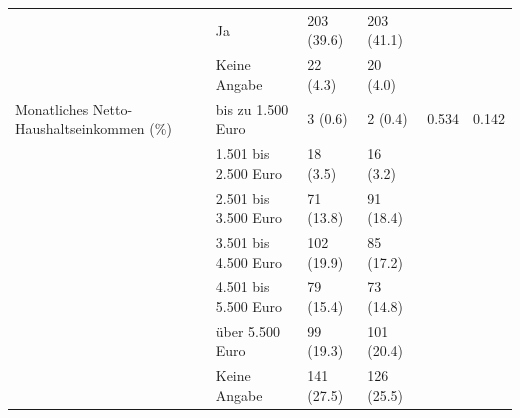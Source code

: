 \begin{table}[!h]
{\begin{tabular}[t]{llllll}
 & Ja & 203 (39.6) & 203 (41.1) &  & \\
 & Keine Angabe & 22 (4.3) & 20 (4.0) &  & \\
Monatliches Netto-Haushaltseinkommen (\%) & bis zu 1.500 Euro & 3 (0.6) & 2 (0.4) & 0.534 & 0.142\\
 & 1.501 bis 2.500 Euro & 18 (3.5) & 16 (3.2) &  & \\
 & 2.501 bis 3.500 Euro & 71 (13.8) & 91 (18.4) &  & \\
 & 3.501 bis 4.500 Euro & 102 (19.9) & 85 (17.2) &  & \\
 & 4.501 bis 5.500 Euro & 79 (15.4) & 73 (14.8) &  & \\
 & über 5.500 Euro & 99 (19.3) & 101 (20.4) &  & \\
 & Keine Angabe & 141 (27.5) & 126 (25.5) &  & \\
\bottomrule
\end{tabular}}
\end{table}
